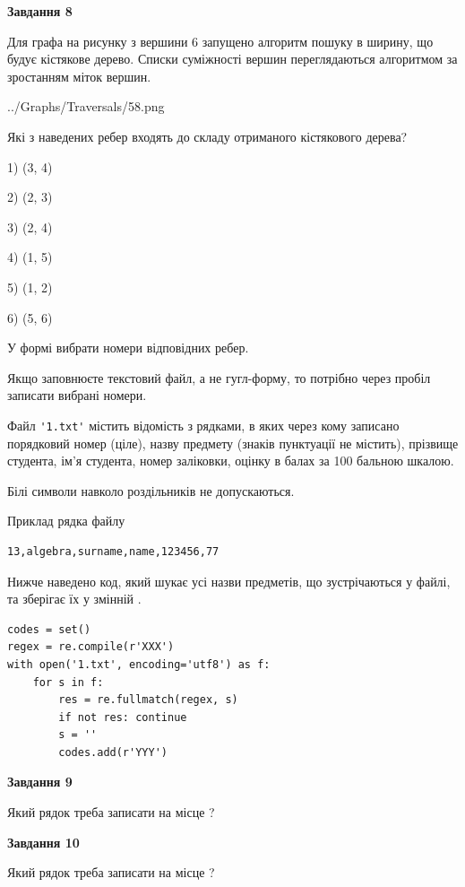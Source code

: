 \documentclass[12pt, ukrainian]{article}
\def\code#1{\Verb!#1!}
\begin{document}
{\begin {large}
{\begin {center}\textbf{Завдання 8}\end {center}}\par
Для графа на рисунку з вершини 6 запущено алгоритм пошуку в ширину, що будує кістякове дерево. Списки суміжності вершин переглядаються алгоритмом за зростанням міток вершин.\par
\begin{center}
	{../Graphs/Traversals/58.png}
\end{center}
\par Які з наведених ребер входять до складу отриманого кістякового дерева?\par
1) (3, 4)\par
2) (2, 3)\par
3) (2, 4)\par
4) (1, 5)\par
5) (1, 2)\par
6) (5, 6)\par
{\vskip 15pt} У формі вибрати номери відповідних ребер.


Якщо заповнюєте текстовий файл, а не гугл-форму, то потрібно через пробіл записа\-ти вибрані номери.\par
\newpage


Файл \code{'1.txt'} містить відомість з рядками, в яких через кому записано поряд\-ковий номер (ціле), назву предмету (знаків пунктуації не містить), прізвище студента, ім'я студента, номер заліковки, оцінку в балах за 100 бальною шкалою.

Білі символи навколо роздільників не допускаються.

Приклад рядка файлу



\begin{verbatim}
13,algebra,surname,name,123456,77
\end{verbatim}


Нижче наведено код, який шукає усі назви предметів, що зустрічаються у файлі, та зберігає їх у змінній .



\begin{verbatim}
codes = set()
regex = re.compile(r'XXX')
with open('1.txt', encoding='utf8') as f:
    for s in f:
        res = re.fullmatch(regex, s)
        if not res: continue
        s = ''
        codes.add(r'YYY')
\end{verbatim}


{\begin {center}\textbf{Завдання 9}\end {center}}\par
Який рядок треба записати на місце  ?\par
\vspace{5mm}


{\begin {center}\textbf{Завдання 10}\end {center}}\par
Який рядок треба записати на місце  ?\par


\newpage


\end {large}}
\end{document}
